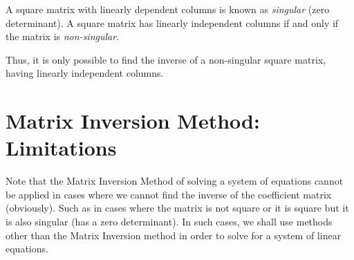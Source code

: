 \para

A square matrix with linearly dependent columns is known as \textit{singular} (zero determinant). A square matrix has linearly independent columns if and only if the matrix is \textit{non-singular}.

\para

Thus, it is only possible to find the inverse of a non-singular square matrix, having linearly independent columns.

\para

\section{Matrix Inversion Method: Limitations}

Note that the Matrix Inversion Method of solving a system of equations cannot be applied in cases where we cannot find the inverse of the coefficient matrix (obviously). Such as in cases where the matrix is not square or it is square but it is also singular (has a zero determinant). In such cases, we shall use methods other than the Matrix Inversion method in order to solve for a system of linear equations.
